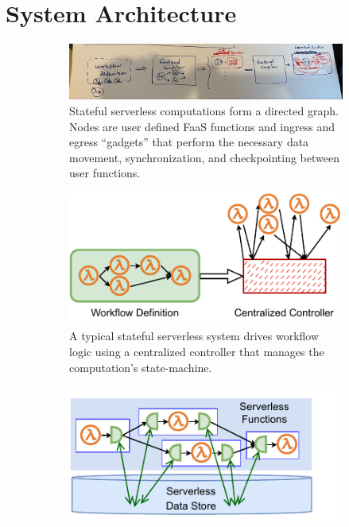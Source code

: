 

\section{System Architecture}\label{sec:architecture}

\begin{figure}[t]
    \centering
    \begin{subfigure}[t]{0.8\textwidth}
   \includegraphics[width=\columnwidth]{figures/architecture.png}
        \caption{Stateful serverless computations form a directed graph. Nodes
                are user defined FaaS functions and ingress and egress ``gadgets'' that perform the necessary data movement, synchronization, and checkpointing between user functions.}
        \label{fig:arch:unum-compile-time}
    \end{subfigure}
    \begin{subfigure}[b]{\columnwidth}
    \centering
        \includegraphics[width=0.8\columnwidth]{figures/unum-arch-centralized.pdf}
        \caption{A typical stateful serverless system drives workflow logic
                 using a centralized controller that manages the computation's state-machine.}
        \label{fig:arch:centralized}
    \end{subfigure}
    \hfill
    \begin{subfigure}[b]{\columnwidth}
    \centering
        \includegraphics[width=.7\columnwidth]{figures/unum-arch-runtime.pdf}

\end{subfigure}
\end{figure}
